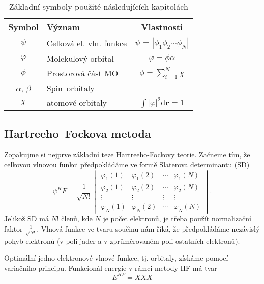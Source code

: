 \begin{table}[ht]
\centering
\caption{Základní symboly použité následujících kapitolách}
\begin{tabular}{|c|l|c|}
\hline 
\rule[-1ex]{0pt}{2.5ex} Symbol & 	Význam	& Vlastnosti \\ 
\hline 
\rule[-1ex]{0pt}{2.5ex} $\psi$ & Celková el. vln. funkce  & $\psi$ = $|\phi_1 \phi_2 \cdots \phi_N |$ \\ 
\hline 
\rule[-1ex]{0pt}{2.5ex} $\varphi$ & Molekulový orbital & $\varphi=\phi \alpha $\\ 
\hline 
\rule[-1ex]{0pt}{2.5ex} $\phi$ & Prostorová část MO & $\phi=\sum_{i=1}^N \chi $ \\ 
\hline 
\rule[-1ex]{0pt}{2.5ex} $\alpha$, $\beta$  & Spin--orbitaly & \\ 
\hline 
\rule[-1ex]{0pt}{2.5ex} $\chi$ & atomové orbitaly & $\int |\varphi|^2 \mathrm{d}\textbf{r} = 1 $ \\
\hline
\end{tabular} 
\label{tab:vlnfunkce}
\end{table}

\subsection{Hartreeho--Fockova metoda}

Zopakujme si nejprve základní teze Hartreeho-Fockovy teorie. Začneme tím, že celkovou vlnovou funkci předpokládáme ve formě Slaterova determinantu (SD)
\begin{equation}
\psi^HF=\frac{1}{\sqrt{N!}}\begin{vmatrix}
\varphi_1(1) & \varphi_1(2) & \cdots & \varphi_1(N) \\
\varphi_2(1) & \varphi_2(2) & \cdots & \varphi_2(N) \\
\vdots & \vdots & \vdots & \vdots \\
\varphi_N(1) & \varphi_N (2) & \cdots & \varphi_N(N)
\end{vmatrix}.
\end{equation}
Jelikož SD má $N!$ členů, kde $N$ je počet elektronů, je třeba použít normalizační faktor $\frac{1}{\sqrt{N!}}$. Vlnová funkce ve tvaru součinu nám říká, že předpokládáme nezávislý pohyb elektronů (v poli jader a v zprůměrovaném poli ostatních elektronů).

Optimální jedno-elektronové vlnové funkce, tj. orbitaly, získáme pomocí variačního principu. Funkcionál energie v rámci metody HF má tvar 
\begin{equation}
E^{HF}=  XXX 
\end{equation}

